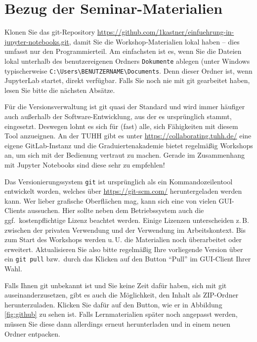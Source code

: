 \documentclass{tufte-handout}
\begin{document}
\section{Bezug der Seminar-Materialien}
\label{sec:git-clone}

Klonen Sie das git-Repository
\url{https://github.com/1kastner/einfuehrung-in-jupyter-notebooks.git},
damit Sie die Workshop-Materialien lokal haben -- dies umfasst nur den Programmierteil.
Am einfachsten ist es, wenn Sie die Dateien lokal unterhalb des benutzer\-eigenen Ordners \texttt{Dokumente} ablegen
(unter Windows typischerweise \texttt{C:\textbackslash{}Users\textbackslash{}BENUTZERNAME\textbackslash{}Documents}.
Denn dieser Ordner ist, wenn JupyterLab startet, direkt verfügbar.
Falls Sie noch nie mit git gearbeitet haben, lesen Sie bitte die nächsten Absätze.

Für die Versionsverwaltung ist git quasi der Standard und wird immer häufiger auch außerhalb der Software-Entwicklung, aus der es ursprünglich stammt, eingesetzt.
Deswegen lohnt es sich für (fast) alle, sich Fähigkeiten mit diesem Tool anzueignen.
An der TUHH gibt es unter
\url{https://collaborating.tuhh.de/}
eine eigene GitLab-Instanz und die Graduiertenakademie bietet regelmäßig Workshops an, um sich mit der Bedienung vertraut zu machen.
Gerade im Zusammenhang mit Jupyter Notebooks sind diese sehr zu empfehlen!

Das Versionierungssystem \texttt{git} ist ursprünglich als ein Kommandozeilentool entwickelt worden, welches über \url{https://git-scm.com/} heruntergeladen werden kann.
Wer lieber grafische Oberflächen mag, kann sich eine von vielen GUI-Clients%
aussuchen.
Hier sollte neben dem Betriebssystem auch die ggf.\ kostenpflichtige Lizenz beachtet werden.
Einige Lizenzen unterscheiden z.\,B. zwischen der privaten Verwendung und der Verwendung im Arbeitskontext.
Bis zum Start des Workshops werden u.\,U. die Materialien noch überarbeitet oder erweitert.
Aktualisieren Sie also bitte regelmäßig Ihre vorliegende Version über ein \texttt{git pull} bzw.\ durch das Klicken auf den Button \enquote{Pull} im GUI-Client Ihrer Wahl.

Falls Ihnen git unbekannt ist und Sie keine Zeit dafür haben, sich mit git auseinanderzusetzen, gibt es auch die Möglichkeit, den Inhalt als ZIP-Ordner herunterzuladen.
Klicken Sie dafür auf den Button, wie er in Abbildung\,\ref{fig:github} zu sehen ist.
Falls Lernmaterialien später noch angepasst werden, müssen Sie diese dann allerdings erneut herunterladen und in einem neuen Ordner entpacken.
\end{document}
